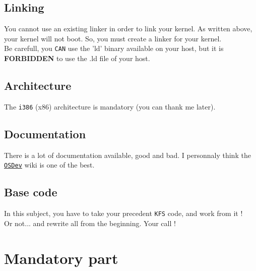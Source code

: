 \documentclass{42-en}
\begin{document}
	\section{Linking}
		You cannot use an existing linker in order to link your kernel.
		As written above, your kernel will not boot. So, you must create a linker
		for your kernel.\\
		Be carefull, you \texttt{CAN} use the 'ld' binary available on your host,
		but it is \textbf{FORBIDDEN} to use the .ld file of your host.
	\section{Architecture}
		The \texttt{i386} (x86) architecture is mandatory (you can thank me later).
	\section{Documentation}
		There is a lot of documentation available, good and bad.
		I personnaly think the \texttt{\href{http://wiki.osdev.org/Main_Page}
		{OSDev}} wiki is one of the best.
	\section{Base code}
		In this subject, you have to take your precedent \texttt{KFS} code,
		and work from it !\\ Or not... and rewrite all from the beginning. 
		Your call !

\newpage
\chapter{Mandatory part}
\end{document}
